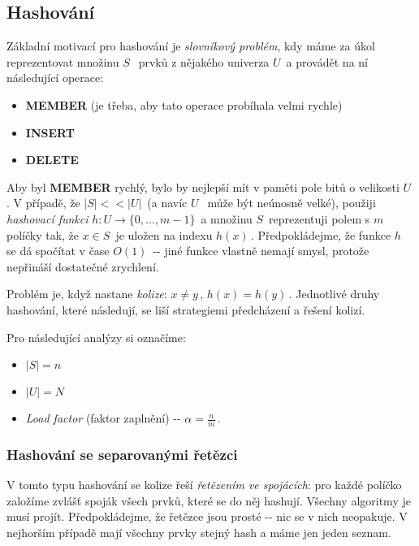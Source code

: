 \subsection{Hashování}\label{hashovuxe1nuxed}

Základní motivací pro hashování je \emph{slovníkový problém}, kdy máme
za úkol reprezentovat množinu \(S\,\;\) prvků z nějakého univerza
\(U\,\!\) a provádět na ní následující operace:

\begin{itemize}
\tightlist
\item
  \textbf{MEMBER} (je třeba, aby tato operace probíhala velmi rychle)
\item
  \textbf{INSERT}
\item
  \textbf{DELETE}
\end{itemize}

Aby byl \textbf{MEMBER} rychlý, bylo by nejlepší mít v paměti pole bitů
o velikosti \(U\,\!\). V případě, že \(|S|<<|U|\,\!\) (a navíc \(U\,\;\)
může být neúnosně velké), použiji \emph{hashovací funkci}
\(h:U\to\{0,\dots,m-1\}\,\!\) a množinu \(S\,\!\) reprezentuji polem s
\(m\,\!\) políčky tak, že \(x\in S\,\!\) je uložen na indexu
\(h(x)\,\!\). Předpokládejme, že funkce \(h\,\!\) se dá spočítat v čase
\(O(1)\,\!\) -\/- jiné funkce vlastně nemají smysl, protože nepřináší
dostatečné zrychlení.

Problém je, když nastane \emph{kolize}: \(x\neq y\,\!\),
\(h(x)=h(y)\,\!\). Jednotlivé druhy hashování, které následují, se liší
strategiemi předcházení a řešení kolizí.

Pro následující analýzy si označíme:

\begin{itemize}
\tightlist
\item
  \(|S|=n\,\!\)
\item
  \(|U|=N\,\!\)
\item
  \emph{Load factor} (faktor zaplnění) -\/- \(\alpha=\frac{n}{m}\,\!\).
\end{itemize}

\subsubsection{Hashování se separovanými
řetězci}\label{hashovuxe1nuxed-se-separovanuxfdmi-ux159etux11bzci}

V tomto typu hashování se kolize řeší \emph{řetězením ve spojácích}: pro
každé políčko založíme zvlášť spoják všech prvků, které se do něj
hashují. Všechny algoritmy je musí projít. Předpokládejme, že řetězce
jsou prosté -\/- nic se v nich neopakuje. V nejhorším případě mají
všechny prvky stejný hash a máme jen jeden seznam.

